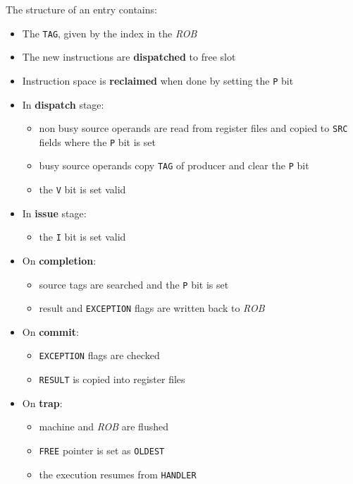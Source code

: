\documentclass[english]{article}
\begin{document}
\begin{minipage}{\textwidth}
  \bigskip
  The structure of an entry contains:

  \begin{itemize}
    \item The \texttt{TAG}, given by the index in the \textit{ROB}
    \item The new instructions are \textbf{dispatched} to free slot
    \item Instruction space is \textbf{reclaimed} when done by setting the \texttt{P} bit
    \item In \textbf{dispatch} stage:
          \begin{itemize}
            \item non busy source operands are read from register files and copied to \texttt{SRC} fields where the \texttt{P} bit is set
            \item busy source operands copy \texttt{TAG} of producer and clear the \texttt{P} bit
            \item the \texttt{V} bit is set valid
          \end{itemize}
    \item In \textbf{issue} stage:
          \begin{itemize}
            \item the \texttt{I} bit is set valid
          \end{itemize}
    \item On \textbf{completion}:
          \begin{itemize}
            \item source tags are searched and the \texttt{P} bit is set
            \item result and \texttt{EXCEPTION} flags are written back to \textit{ROB}
          \end{itemize}
    \item On \textbf{commit}:
          \begin{itemize}
            \item \texttt{EXCEPTION} flags are checked
            \item \texttt{RESULT} is copied into register files
          \end{itemize}
    \item On \textbf{trap}:
          \begin{itemize}
            \item machine and \textit{ROB} are flushed
            \item \texttt{FREE} pointer is set as \texttt{OLDEST}
            \item the execution resumes from \texttt{HANDLER}
          \end{itemize}
  \end{itemize}
\end{minipage}
\end{document}
